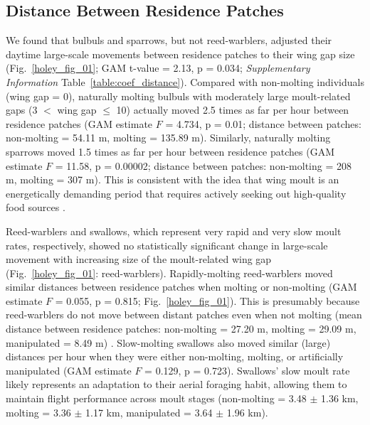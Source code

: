 
\subsection*{Distance Between Residence Patches}

We found that bulbuls and sparrows, but not reed-warblers, adjusted their daytime large-scale movements between residence patches to their wing gap size (Fig.~\ref{holey_fig_01}; GAM t-value = 2.13, p = 0.034; \textit{Supplementary Information} Table~\ref{table:coef_distance}).
Compared with non-molting individuals (wing gap = 0), naturally molting bulbuls with moderately large moult-related gaps (3 $<$ wing gap $\leq$ 10) actually moved 2.5 times as far per hour between residence patches (GAM estimate $F$ = 4.734, p = 0.01; distance between patches: non-molting = 54.11 m, molting = 135.89 m).
Similarly, naturally molting sparrows moved {1.5 times} as far per hour between residence patches (GAM estimate $F$ = 11.58, p = 0.00002; distance between patches: non-molting = 208 m, molting = 307 m).
This is consistent with the idea that wing moult is an energetically demanding period that requires actively seeking out high-quality food sources \citep{madsen1987,fox1998}.

Reed-warblers and swallows, which represent very rapid and very slow moult rates, respectively, showed no statistically significant change in large-scale movement with increasing size of the moult-related wing gap (Fig.~\ref{holey_fig_01}: reed-warblers).
Rapidly-molting reed-warblers moved similar distances between residence patches when molting or non-molting (GAM estimate $F$ = 0.055, p = 0.815; Fig.~\ref{holey_fig_01}).
This is presumably because reed-warblers 
do not move between distant patches even when not molting (mean distance between residence patches: non-molting = 27.20 m, molting = 29.09 m, manipulated = 8.49 m) \citep{kiat2016}.
Slow-molting swallows also moved similar (large) distances per hour when they were either non-molting, molting, or artificially manipulated (GAM estimate $F$ = 0.129, p = 0.723).
Swallows' slow moult rate likely represents an adaptation to their aerial foraging habit, allowing them to maintain flight performance across moult stages (non-molting = 3.48 $\pm$ 1.36 km, molting = 3.36 $\pm$ 1.17 km, manipulated = 3.64 $\pm$ 1.96 km).

